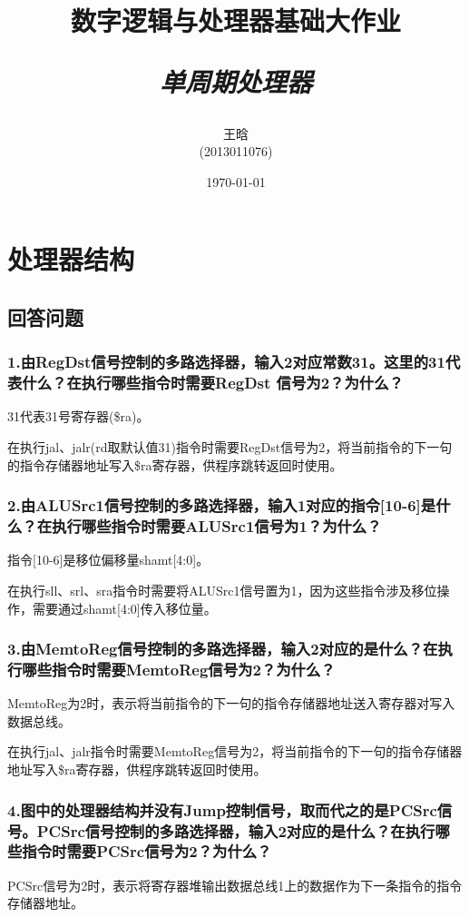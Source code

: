 \documentclass{article}
\begin{document}
	\title{数字逻辑与处理器基础大作业 \\ [2ex] \begin{large} \emph{单周期处理器} \end{large} }
	\author{王晗\\(2013011076)}
	\date{\today}
	\maketitle
	\section{处理器结构}
		\subsection{回答问题}
            \subsubsection*{1.由RegDst信号控制的多路选择器，输入2对应常数31。这里的31代表什么？在执行哪些指令时需要RegDst 信号为2？为什么？}
            31代表31号寄存器(\$ra)。

            在执行jal、jalr(rd取默认值31)指令时需要RegDst信号为2，将当前指令的下一句的指令存储器地址写入\$ra寄存器，供程序跳转返回时使用。
            \subsubsection*{2.由ALUSrc1信号控制的多路选择器，输入1对应的指令[10-6]是什么？在执行哪些指令时需要ALUSrc1信号为1？为什么？}
            指令[10-6]是移位偏移量shamt[4:0]。

            在执行sll、srl、sra指令时需要将ALUSrc1信号置为1，因为这些指令涉及移位操作，需要通过shamt[4:0]传入移位量。
            \subsubsection*{3.由MemtoReg信号控制的多路选择器，输入2对应的是什么？在执行哪些指令时需要MemtoReg信号为2？为什么？}
            MemtoReg为2时，表示将当前指令的下一句的指令存储器地址送入寄存器对写入数据总线。

            在执行jal、jalr指令时需要MemtoReg信号为2，将当前指令的下一句的指令存储器地址写入\$ra寄存器，供程序跳转返回时使用。
            \subsubsection*{4.图中的处理器结构并没有Jump控制信号，取而代之的是PCSrc信号。PCSrc信号控制的多路选择器，输入2对应的是什么？在执行哪些指令时需要PCSrc信号为2？为什么？}
            PCSrc信号为2时，表示将寄存器堆输出数据总线1上的数据作为下一条指令的指令存储器地址。
\end{document}
